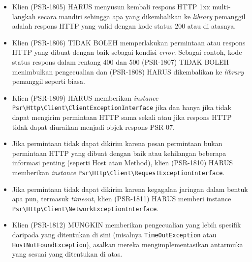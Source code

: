\documentclass[a4paper,twoside]{article}
\begin{document}
\begin{enumerate}
\begin{enumerate}
\begin{itemize}
\begin{itemize}
					\item Klien (PSR-1805) HARUS menyusun kembali respons HTTP 1xx multi-langkah secara mandiri sehingga apa yang dikembalikan ke \textit{library} pemanggil adalah respons HTTP yang valid dengan kode status 200 atau di atasnya.
					
					\item Klien (PSR-1806) TIDAK BOLEH memperlakukan permintaan atau respons HTTP yang dibuat dengan baik sebagai kondisi \textit{error}. Sebagai contoh, kode status respons dalam rentang 400 dan 500 (PSR-1807) TIDAK BOLEH menimbulkan pengecualian dan (PSR-1808) HARUS dikembalikan ke \textit{library} pemanggil seperti biasa.
					\item Klien (PSR-1809) HARUS memberikan \textit{instance} \verb|Psr\Http\Client\ClientExceptionInterface| jika dan hanya jika tidak dapat mengirim permintaan HTTP sama sekali atau jika respons HTTP tidak dapat diuraikan menjadi objek respons PSR-07.
					\item Jika permintaan tidak dapat dikirim karena pesan permintaan bukan permintaan HTTP yang dibuat dengan baik atau kehilangan beberapa informasi penting (seperti Host atau Method), klien (PSR-1810) HARUS memberikan \textit{instance} \verb|Psr\Http\Client\RequestExceptionInterface|.
					\item Jika permintaan tidak dapat dikirim karena kegagalan jaringan dalam bentuk apa pun, termasuk \textit{timeout}, klien (PSR-1811) HARUS memberi instance \verb|Psr\Http\Client\NetworkExceptionInterface|.
					\item Klien (PSR-1812) MUNGKIN memberikan pengecualian yang lebih spesifik daripada yang ditentukan di sini (misalnya \verb|TimeOutException| atau \verb|HostNotFoundException|), asalkan mereka mengimplementasikan antarmuka yang sesuai yang ditentukan di atas.
				\end{itemize}
				

\end{itemize}
\end{enumerate}
\end{enumerate}
\end{document}
